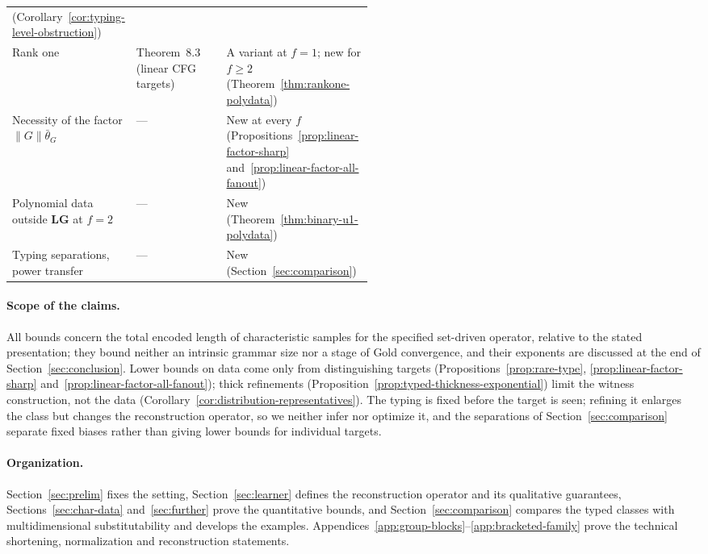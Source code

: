 \documentclass[11pt]{article}
\numberwithin{equation}{section}
\theoremstyle{plain}
\theoremstyle{definition}
\theoremstyle{remark}
\begin{document}
\begin{table}[htbp]
\begin{tabularx}{\linewidth}{@{}>{\raggedright\arraybackslash}p{0.27\linewidth}>{\raggedright\arraybackslash}p{0.25\linewidth}>{\raggedright\arraybackslash}X@{}}
   (Corollary~\ref{cor:typing-level-obstruction})\\
Rank one
 & Theorem~8.3 (linear CFG targets)
 & A variant at $f=1$; new for $f\ge2$ (Theorem~\ref{thm:rankone-polydata})\\
Necessity of the factor $\|G\|\bar\theta_G$
 & ---
 & New at every $f$ (Propositions~\ref{prop:linear-factor-sharp}
   and~\ref{prop:linear-factor-all-fanout})\\
Polynomial data outside $\mathbf{LG}$ at $f=2$
 & ---
 & New (Theorem~\ref{thm:binary-u1-polydata})\\
Typing separations, power transfer
 & ---
 & New (Section~\ref{sec:comparison})\\
\hline
\end{tabularx}
\end{table}

\paragraph{Scope of the claims.}
All bounds concern the total encoded length of characteristic samples for
the specified set-driven operator, relative to the stated presentation;
they bound neither an intrinsic grammar size nor a stage of Gold
convergence, and their exponents are discussed at the end of
Section~\ref{sec:conclusion}.  Lower bounds on data come only from
distinguishing targets (Propositions~\ref{prop:rare-type}, \ref{prop:linear-factor-sharp}
and~\ref{prop:linear-factor-all-fanout}); thick
refinements (Proposition~\ref{prop:typed-thickness-exponential}) limit the
witness construction, not the data
(Corollary~\ref{cor:distribution-representatives}).  The typing is fixed before
the target is seen; refining it enlarges the class but changes the
reconstruction operator, so we neither infer nor optimize it, and the
separations of Section~\ref{sec:comparison} separate fixed biases rather
than giving lower bounds for individual targets.

\paragraph{Organization.}
Section~\ref{sec:prelim} fixes the setting, Section~\ref{sec:learner}
defines the reconstruction operator and its qualitative guarantees,
Sections~\ref{sec:char-data} and~\ref{sec:further} prove the quantitative
bounds, and Section~\ref{sec:comparison} compares the typed classes with
multidimensional substitutability and develops the examples.
Appendices~\ref{app:group-blocks}--\ref{app:bracketed-family} prove the
technical shortening, normalization and reconstruction statements.
\end{document}
